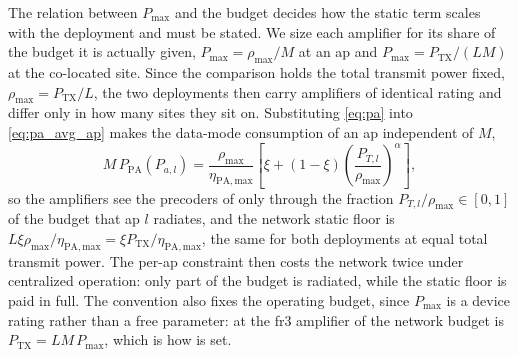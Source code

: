 \begin{remark}
\label{rem:pa_sizing}
The relation between $P_{\max}$ and the budget decides how the static term scales
with the deployment and must be stated. We size each amplifier for its share of
the budget it is actually given, $P_{\max}=\rho_{\max}/M$ at an \gls{ap} and
$P_{\max}=P_{\mathrm{TX}}/(LM)$ at the co-located site. Since the comparison
holds the total transmit power fixed, $\rho_{\max}=P_{\mathrm{TX}}/L$, the two
deployments then carry amplifiers of identical rating and differ only in how many
sites they sit on. Substituting \eqref{eq:pa} into \eqref{eq:pa_avg_ap} makes the
data-mode consumption of an \gls{ap} independent of $M$,
\begin{equation}
\label{eq:pa_compact}
M\,P_{\mathrm{PA}}(P_{a,l}) =
\frac{\rho_{\max}}{\eta_{\mathrm{PA,max}}}\left[\xi + (1-\xi)
\left(\frac{P_{T,l}}{\rho_{\max}}\right)^{\alpha}\right],
\end{equation}
so the amplifiers see the precoders of  only through the
fraction $P_{T,l}/\rho_{\max}\in[0,1]$ of the budget that \gls{ap} $l$ radiates,
and the network static floor is $L\xi\rho_{\max}/\eta_{\mathrm{PA,max}} =
\xi P_{\mathrm{TX}}/\eta_{\mathrm{PA,max}}$, the same for both deployments at
equal total transmit power. The per-\gls{ap} constraint then costs the network
twice under centralized operation: only part of the budget is radiated, while
the static floor is paid in full.
The convention also fixes the operating budget, since $P_{\max}$ is a device
rating rather than a free parameter: at the \gls{fr3} amplifier of
\cite{peschiera2026fr3} the network budget is $P_{\mathrm{TX}}=LM\,P_{\max}$,
which is how  is set.
\end{remark}

